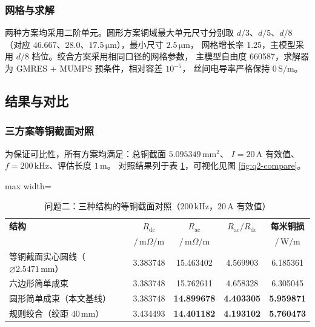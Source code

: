 \documentclass[12pt, a4paper]{ctexart}
\newcommand{\Rac}{R_{\mathrm{ac}}}
\newcommand{\Rdc}{R_{\mathrm{dc}}}
\newcommand{\U}[1]{\ensuremath{\,\mathrm{#1}}}
\newcommand{\Uohm}{\ensuremath{\,\mathrm{m}\Omega/\mathrm{m}}}%
\begin{document}
\subsubsection{网格与求解}

两种方案均采用二阶单元。圆形方案铜域最大单元尺寸分别取 $d/3$、$d/5$、$d/8$
（对应 $46.667$、$28.0$、$17.5\U{\mu m}$），最小尺寸 $2.5\U{\mu m}$，
网格增长率 1.25，主模型采用 $d/8$ 档位。绞合方案采用相同口径的网格参数，
主模型自由度 660587，求解器为 GMRES + MUMPS 预条件，相对容差 $10^{-5}$，
丝间电导率严格保持 $0\U{S/m}$。

\subsection{结果与对比}
\label{sec:q2-compare}

\subsubsection{三方案等铜截面对照}

为保证可比性，所有方案均满足：总铜截面 $5.095349\U{mm^2}$、
$I = 20\U{A}$ 有效值、$f = 200\U{kHz}$、评估长度 $1\U{m}$。
对照结果列于表 \ref{tab:q2-compare}，可视化见图 \ref{fig:q2-compare}。

\begin{table}[H]
\centering
\caption{问题二：三种结构的等铜截面对照（$200\U{kHz}$，$20\U{A}$ 有效值）}
\label{tab:q2-compare}
\small
\begin{adjustbox}{max width=\textwidth}
\begin{tabular}{l c c c c}
\toprule
\textbf{结构} & $\Rdc$ & $\Rac$ & $\Rac/\Rdc$ & \textbf{每米铜损} \\
 & $/\Uohm$ & $/\Uohm$ & & $/\U{W/m}$ \\
\midrule
等铜截面实心圆线（$\varnothing 2.5471\U{mm}$） & 3.383748 & 15.463402 & 4.569903 & 6.185361 \\
六边形简单成束                                  & 3.383748 & 15.762611 & 4.658328 & 6.305045 \\
圆形简单成束（本文基线）                        & 3.383748 & \textbf{14.899678} & \textbf{4.403305} & \textbf{5.959871} \\
\midrule
规则绞合（绞距 $40\U{mm}$）                  & 3.434493 & \textbf{14.401182} & \textbf{4.193102} & \textbf{5.760473} \\
\bottomrule
\end{tabular}
\end{adjustbox}
\end{table}
\end{document}
